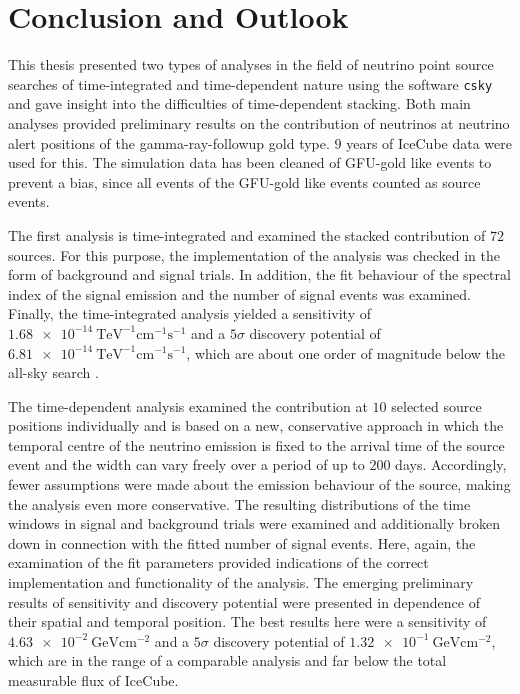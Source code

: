 \chapter{Conclusion and Outlook} \label{sec:outlook}

This thesis presented two types of analyses in the field of neutrino point source searches of time-integrated and time-dependent nature using the software \texttt{csky} and gave insight into the difficulties of time-dependent stacking.
Both main analyses provided preliminary results on the contribution of neutrinos at neutrino alert positions of the gamma-ray-followup gold type.
$\num{9}$ years of IceCube data were used for this.
The simulation data has been cleaned of GFU-gold like events to prevent a bias, since all events of the GFU-gold like events counted as source events.

The first analysis is time-integrated and examined the stacked contribution of $\num{72}$ sources.
For this purpose, the implementation of the analysis was checked in the form of background and signal trials.
In addition, the fit behaviour of the spectral index of the signal emission and the number of signal events was examined.
Finally, the time-integrated analysis yielded a sensitivity of $\SI{1.68e-14}{\tera\electronvolt\tothe{-1}\centi\meter\tothe{-1}\second\tothe{-1}}$ and a $\num{5}\sigma$ discovery potential of $\SI{6.81e-14}{\tera\electronvolt\tothe{-1}\centi\meter\tothe{-1}\second\tothe{-1}}$, which are about one order of magnitude below the all-sky search \cite{all_sky_paper}.

The time-dependent analysis examined the contribution at $\num{10}$ selected source positions individually and is based on a new, conservative approach in which the temporal centre of the neutrino emission is fixed to the arrival time of the source event and the width can vary freely over a period of up to $\num{200}$ days.
Accordingly, fewer assumptions were made about the emission behaviour of the source, making the analysis even more conservative.
The resulting distributions of the time windows in signal and background trials were examined and additionally broken down in connection with the fitted number of signal events.
Here, again, the examination of the fit parameters provided indications of the correct implementation and functionality of the analysis.
The emerging preliminary results of sensitivity and discovery potential were presented in dependence of their spatial and temporal position.
The best results here were a sensitivity of $\SI{4.63e-2}{\giga\electronvolt\centi\meter\tothe{-2}}$ and a $\num{5}\sigma$ discovery potential of $\SI{1.32e-1}{\giga\electronvolt\centi\meter\tothe{-2}}$, which are in the range of a comparable analysis \cite{martina} and far below the total measurable flux of IceCube.

